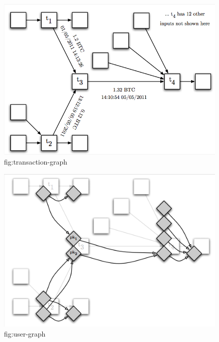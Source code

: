 \begin{figure}
\begin{center}
\includegraphics[scale=0.35]{images/transaction_graph.png}
\caption{fig:transaction-graph}
\end{center}
\end{figure}

\begin{figure}
\begin{center}
\includegraphics[scale=0.45]{images/transaction_user_graph.png}
\caption{fig:user-graph}
\end{center}
\end{figure}

